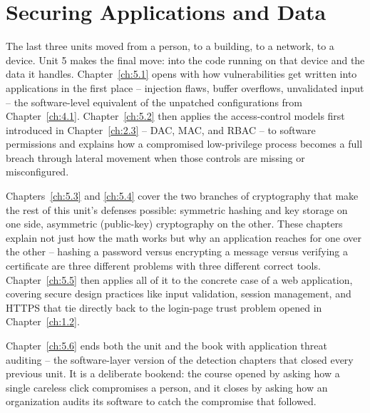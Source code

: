 \part{Securing Applications and Data}

The last three units moved from a person, to a building, to a network, to a device. Unit 5 makes
the final move: into the code running on that device and the data it handles. Chapter~\ref{ch:5.1}
opens with how vulnerabilities get written into applications in the first place -- injection
flaws, buffer overflows, unvalidated input -- the software-level equivalent of the unpatched
configurations from Chapter~\ref{ch:4.1}. Chapter~\ref{ch:5.2} then applies the access-control
models first introduced in Chapter~\ref{ch:2.3} -- DAC, MAC, and RBAC -- to software permissions
and explains how a compromised low-privilege process becomes a full breach through lateral
movement when those controls are missing or misconfigured.

Chapters~\ref{ch:5.3} and \ref{ch:5.4} cover the two branches of cryptography that make the rest
of this unit's defenses possible: symmetric hashing and key storage on one side, asymmetric
(public-key) cryptography on the other. These chapters explain not just how the math works but
why an application reaches for one over the other -- hashing a password versus encrypting a
message versus verifying a certificate are three different problems with three different correct
tools. Chapter~\ref{ch:5.5} then applies all of it to the concrete case of a web application,
covering secure design practices like input validation, session management, and HTTPS that tie
directly back to the login-page trust problem opened in Chapter~\ref{ch:1.2}.

Chapter~\ref{ch:5.6} ends both the unit and the book with application threat auditing --
the software-layer version of the detection chapters that closed every previous unit. It is a
deliberate bookend: the course opened by asking how a single careless click compromises a person,
and it closes by asking how an organization audits its software to catch the compromise that
followed.
